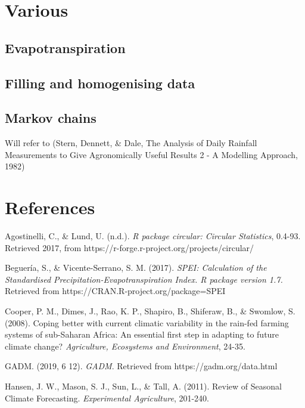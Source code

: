 \documentclass[
  letterpaper,
  DIV=11,
  numbers=noendperiod]{scrreprt}
\begin{document}

\chapter{Various}\label{various}

\section{Evapotranspiration}\label{evapotranspiration}

\section{Filling and homogenising
data}\label{filling-and-homogenising-data}

\section{Markov chains}\label{markov-chains}

Will refer to (Stern, Dennett, \& Dale, The Analysis of Daily Rainfall
Measurements to Give Agronomically Useful Results 2 - A Modelling
Approach, 1982)


\chapter{References}\label{references}

Agostinelli, C., \& Lund, U. (n.d.). \emph{R package
\textquotesingle circular\textquotesingle: Circular Statistics}, 0.4-93.
Retrieved 2017, from https://r-forge.r-project.org/projects/circular/

Beguería, S., \& Vicente-Serrano, S. M. (2017). \emph{SPEI: Calculation
of the Standardised Precipitation-Evapotranspiration Index. R package
version 1.7.} Retrieved from https://CRAN.R-project.org/package=SPEI

Cooper, P. M., Dimes, J., Rao, K. P., Shapiro, B., Shiferaw, B., \&
Swomlow, S. (2008). Coping better with current climatic variability in
the rain-fed farming systems of sub-Saharan Africa: An essential first
step in adapting to future climate change? \emph{Agriculture, Ecosystems
and Environment}, 24-35.

GADM. (2019, 6 12). \emph{GADM}. Retrieved from
https://gadm.org/data.html

Hansen, J. W., Mason, S. J., Sun, L., \& Tall, A. (2011). Review of
Seasonal Climate Forecasting. \emph{Experimental Agriculture}, 201-240.
\end{document}
